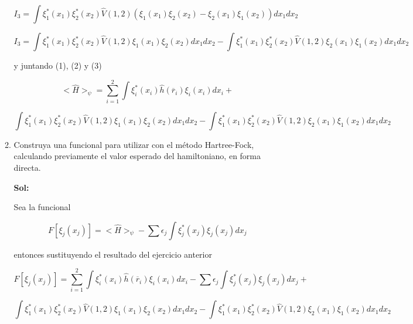 \documentclass[12pt,a4paper]{article}
\begin{document}
\begin{enumerate}
\begin{enumerate}
    \begin{equation*}
        I_3 = \int  \xi_{1}^{*} (x_1) \xi_{2}^{*} (x_2) \hat{V}(1,2)(\xi_{1} (x_1) \xi_{2} (x_2) - \xi_{2} (x_1) \xi_{1} (x_2)) d x_1 dx_2
    \end{equation*}
    
    \begin{equation}
        I_3= \int  \xi_{1}^{*} (x_1) \xi_{2}^{*} (x_2) \hat{V}(1,2)\xi_{1} (x_1) \xi_{2} (x_2) d x_1 dx_2 - \int  \xi_{1}^{*} (x_1) \xi_{2}^{*} (x_2) \hat{V}(1,2)\xi_{2} (x_1) \xi_{1} (x_2) d x_1 dx_2
    \end{equation}
    
    y juntando (1), (2) y (3)
    
    \begin{equation*}
        <\hat{H}>_\psi = \sum_{i=1}^{2} \int \xi_{i}^{*} (x_i) \hat{h}(\overline{r}_i) \xi_{i} (x_i) dx_i  +
    \end{equation*} 
    
    \begin{equation*}
        \int  \xi_{1}^{*} (x_1) \xi_{2}^{*} (x_2) \hat{V}(1,2)\xi_{1} (x_1) \xi_{2} (x_2) d x_1 dx_2 - \int  \xi_{1}^{*} (x_1) \xi_{2}^{*} (x_2) \hat{V}(1,2)\xi_{2} (x_1) \xi_{1} (x_2) d x_1 dx_2
    \end{equation*}
    
    
    \item Construya una funcional para utilizar con el método Hartree-Fock, calculando previamente el valor esperado del hamiltoniano, en forma directa.
    
    \textbf{Sol:}
    
      Sea la funcional
    
    \begin{equation*}
        F[\xi_j (x_j)] = <\hat{H}>_\psi - \sum \epsilon_j \int\xi_{j}^{*} (x_j) \xi_j (x_j) dx_j
    \end{equation*}
    
    entonces sustituyendo el resultado del ejercicio anterior
    
    \begin{equation*}
        F[\xi_j (x_j)]= \sum_{i=1}^{2} \int \xi_{i}^{*} (x_i) \hat{h}(\overline{r}_i) \xi_{i} (x_i) dx_i  - \sum \epsilon_j \int\xi_{j}^{*} (x_j) \xi_j (x_j) dx_j+
    \end{equation*}
    
    \begin{equation*}
        \int  \xi_{1}^{*} (x_1) \xi_{2}^{*} (x_2) \hat{V}(1,2)\xi_{1} (x_1) \xi_{2} (x_2) d x_1 dx_2 - \int  \xi_{1}^{*} (x_1) \xi_{2}^{*} (x_2) \hat{V}(1,2)\xi_{2} (x_1) \xi_{1} (x_2) d x_1 dx_2
    \end{equation*}
    

\end{enumerate}
\end{enumerate}
\end{document}
